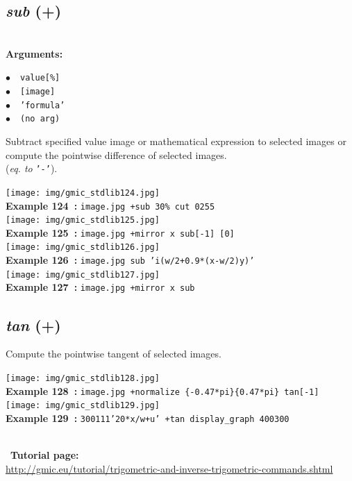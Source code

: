 \documentclass[a4paper,10.5pt,twoside]{book}
\def\comma{\discretionary{,}{}{,}}
\newcommand{\Cb}[1]{\textcolor{cb}{#1}}
\begin{document}
\subsection{\emph{sub} (+)}\vspace*{-0.7em}
~\\\textbf{\Cb{Arguments: }}\begin{flushleft}
{\small \Cb{\hspace*{0.5cm}$\bullet$~~\texttt{value[\%]}}}~~~\\
{\small \Cb{\hspace*{0.5cm}$\bullet$~~\texttt{[image]}}}~~~\\
{\small \Cb{\hspace*{0.5cm}$\bullet$~~\texttt{'formula'}}}~~~\\
{\small \Cb{\hspace*{0.5cm}$\bullet$~~\texttt{(no arg)}}}\end{flushleft}
Subtract specified value{\comma} image or mathematical expression to selected images{\comma}
or compute the pointwise difference of selected images.
~\\(\emph{eq. to} {\small \texttt{'-'}}).
\begin{center}\texttt{[image: img/gmic\_stdlib124.jpg]}\\
{\footnotesize \textbf{Example 124~:} \texttt{image.jpg +sub 30\% cut 0{\comma}255}}
\\\texttt{[image: img/gmic\_stdlib125.jpg]}\\
{\footnotesize \textbf{Example 125~:} \texttt{image.jpg +mirror x sub[-1] [0]}}
\\\texttt{[image: img/gmic\_stdlib126.jpg]}\\
{\footnotesize \textbf{Example 126~:} \texttt{image.jpg sub 'i(w/2+0.9*(x-w/2){\comma}y)'}}
\\\texttt{[image: img/gmic\_stdlib127.jpg]}\\
{\footnotesize \textbf{Example 127~:} \texttt{image.jpg +mirror x sub}}
\end{center}

\subsection{\emph{tan} (+)}\vspace*{-0.7em}
Compute the pointwise tangent of selected images.
\begin{center}\texttt{[image: img/gmic\_stdlib128.jpg]}\\
{\footnotesize \textbf{Example 128~:} \texttt{image.jpg +normalize \{-0.47*pi\}{\comma}\{0.47*pi\} tan[-1]}}
\\\texttt{[image: img/gmic\_stdlib129.jpg]}\\
{\footnotesize \textbf{Example 129~:} \texttt{300{\comma}1{\comma}1{\comma}1{\comma}'20*x/w+u' +tan display\_graph 400{\comma}300}}
\end{center}
~\\
~\textbf{Tutorial page: }\\\url{http://gmic.eu/tutorial/trigometric-and-inverse-trigometric-commands.shtml}
\end{document}
